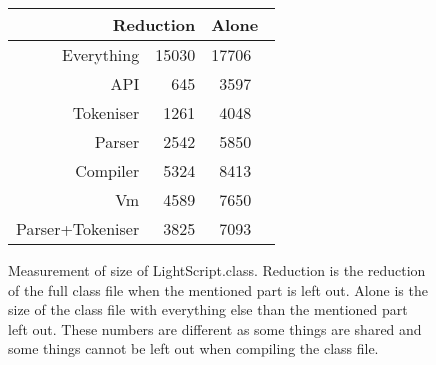\begin{figure}
\begin{center}
\begin{tabular}{|r|r|rl|}
\hline
\multicolumn{2}{|r|}{Reduction} & \multicolumn{2}{|l|}{Alone}\\
\hline
Everything & 15030 & 17706 & \\
\hline
API & 645  & 3597  & \\
\hline
Tokeniser & 1261 & 4048 & \\
\hline
Parser & 2542 & 5850 & \\
\hline
Compiler & 5324 & 8413 & \\
\hline
Vm & 4589 & 7650 & \\
\hline
Parser+Tokeniser & 3825 & 7093 & \\
\hline
\end{tabular}
\end{center}
\caption{ Measurement of size of LightScript.class. Reduction is the reduction of the full class file when the mentioned part is left out. Alone is the size of the class file with everything else than the mentioned part left out. These numbers are different as some things are shared and some things cannot be left out when compiling the class file.}
\end{figure}

